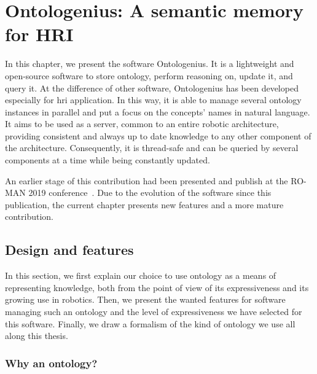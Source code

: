\ifdefined{}
\else
\setcounter{chapter}{2} %
\dominitoc
\faketableofcontents
\fi

\chapter{Ontologenius: A semantic memory for HRI}
\label{chap:ontologenius}
\minitoc
\label{chap:2}

In this chapter, we present the software Ontologenius. It is a lightweight and open-source software to store ontology, perform reasoning on, update it, and query it. At the difference of other software, Ontologenius has been developed especially for \acrlong{hri} application. In this way, it is able to manage several ontology instances in parallel and put a focus on the concepts' names in natural language. It aims to be used as a server, common to an entire robotic architecture, providing consistent and always up to date knowledge to any other component of the architecture. Consequently, it is thread-safe and can be queried by several components at a time while being constantly updated.

An earlier stage of this contribution had been presented and publish at the RO-MAN 2019 conference~\cite{sarthou_2019_ontologenius}. Due to the evolution of the software since this publication, the current chapter presents new features and a more mature contribution.

\section{Design and features}

In this section, we first explain our choice to use ontology as a means of representing knowledge, both from the point of view of its expressiveness and its growing use in robotics. Then, we present the wanted features for software managing such an ontology and the level of expressiveness we have selected for this software. Finally, we draw a formalism of the kind of ontology we use all along this thesis.

\subsection{Why an ontology?}

